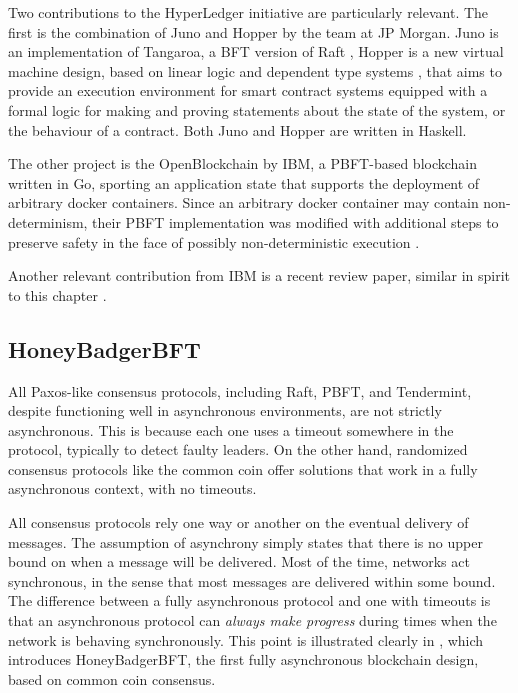 Two contributions to the HyperLedger initiative are particularly relevant.
The first is the combination of Juno and Hopper by the team at JP Morgan.
Juno is an implementation of Tangaroa, a BFT version of Raft \cite{tangaroa},
Hopper is a new virtual machine design,
based on linear logic \cite{girard1987linear} and dependent type systems \cite{bove2009dependent},
that aims to provide an execution environment for smart contract systems equipped with a formal logic
for making and proving statements about the state of the system, or the behaviour of a contract.
Both Juno and Hopper are written in Haskell.

The other project is the OpenBlockchain by IBM, a PBFT-based blockchain written in Go,
sporting an application state that supports the deployment of arbitrary docker containers.
Since an arbitrary docker container may contain non-determinism, their PBFT implementation
was modified with additional steps to preserve safety in the face of possibly non-deterministic execution \cite{cachin2016non}.

Another relevant contribution from IBM is a recent review paper, similar in spirit to this chapter \cite{vukolic11quest}.

\subsection{HoneyBadgerBFT}

All Paxos-like consensus protocols, including Raft, PBFT, and Tendermint, 
despite functioning well in asynchronous environments, are not strictly asynchronous.
This is because each one uses a timeout somewhere in the protocol, typically to detect faulty leaders.
On the other hand, randomized consensus protocols like the common coin offer solutions that work in 
a fully asynchronous context, with no timeouts.

All consensus protocols rely one way or another on the eventual delivery of messages.
The assumption of asynchrony simply states that there is no upper bound on when a message will be delivered.
Most of the time, networks act synchronous, in the sense that most messages are delivered within some bound.
The difference between a fully asynchronous protocol and one with timeouts is that 
an asynchronous protocol can \emph{always make progress} during times when the network is behaving synchronously.
This point is illustrated clearly in \cite{honeybadger}, which introduces HoneyBadgerBFT, 
the first fully asynchronous blockchain design, based on common coin consensus.

